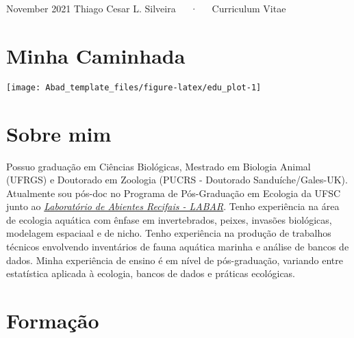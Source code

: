 \documentclass[11pt, a4paper]{awesome-cv}
\begin{document}
\makecvheader

\makecvfooter
  {November 2021}
    {Thiago Cesar L. Silveira~~~·~~~Curriculum Vitae}
  {\thepage}





\hypertarget{minha-caminhada}{%
\section{Minha Caminhada}\label{minha-caminhada}}

\begin{center}\texttt{[image: Abad\_template\_files/figure-latex/edu\_plot-1]} \end{center}

\hypertarget{sobre-mim}{%
\section{Sobre mim}\label{sobre-mim}}

Possuo graduação em Ciências Biológicas, Mestrado em Biologia Animal
(UFRGS) e Doutorado em Zoologia (PUCRS - Doutorado Sanduíche/Gales-UK).
Atualmente sou pós-doc no Programa de Pós-Graduação em Ecologia da UFSC
junto ao \href{https://labarufsc.weebly.com/}{\emph{Laboratório de
Abientes Recifais - LABAR}}. Tenho experiência na área de ecologia
aquática com ênfase em invertebrados, peixes, invasões biológicas,
modelagem espaciaal e de nicho. Tenho experiência na produção de
trabalhos técnicos envolvendo inventários de fauna aquática marinha e
análise de bancos de dados. Minha experiência de ensino é em nível de
pós-graduação, variando entre estatística aplicada à ecologia, bancos de
dados e práticas ecológicas.

\hypertarget{formauxe7uxe3o}{%
\section{Formação}\label{formauxe7uxe3o}}
\end{document}
